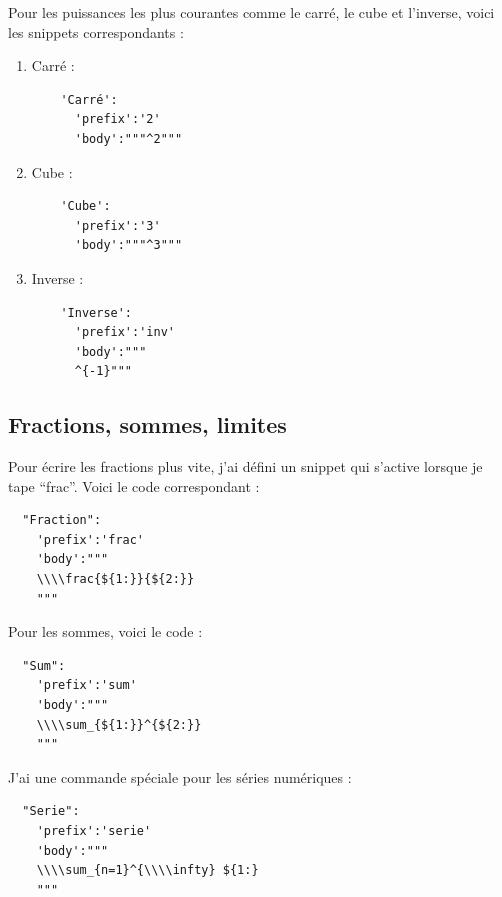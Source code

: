 \documentclass[french]{article}
\theoremstyle{definition}
\theoremstyle{remark}
\begin{document}
Pour les puissances les plus courantes comme le carré, le cube et l'inverse, voici les snippets correspondants :

\begin{enumerate}
  \item Carré :

  \begin{verbatim}
    'Carré':
      'prefix':'2'
      'body':"""^2"""
  \end{verbatim}

  \item Cube :

  \begin{verbatim}
    'Cube':
      'prefix':'3'
      'body':"""^3"""
  \end{verbatim}

  \item Inverse :

  \begin{verbatim}
    'Inverse':
      'prefix':'inv'
      'body':"""
      ^{-1}"""
  \end{verbatim}
\end{enumerate}

\subsection{Fractions, sommes, limites}

Pour écrire les fractions plus vite, j'ai défini un snippet qui s'active lorsque je tape ``frac''. Voici le code correspondant :

\begin{verbatim}
  "Fraction":
    'prefix':'frac'
    'body':"""
    \\\\frac{${1:}}{${2:}}
    """
\end{verbatim}

Pour les sommes, voici le code :

\begin{verbatim}
  "Sum":
    'prefix':'sum'
    'body':"""
    \\\\sum_{${1:}}^{${2:}}
    """
\end{verbatim}

J'ai une commande spéciale pour les séries numériques :

\begin{verbatim}
  "Serie":
    'prefix':'serie'
    'body':"""
    \\\\sum_{n=1}^{\\\\infty} ${1:}
    """
\end{verbatim}
\end{document}
